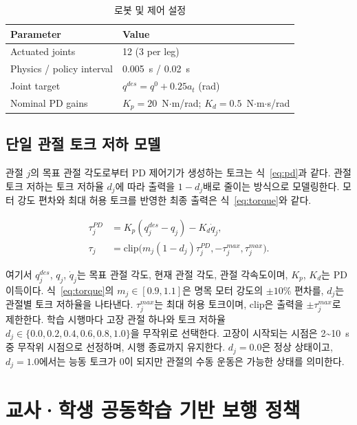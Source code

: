 \begin{table}[!t]
\caption{로봇 및 제어 설정}\label{tab:system}
\centering\paperTableFont
\begin{tabularx}{\columnwidth}{@{}lY@{}}
\toprule
Parameter & Value \\
\midrule
Actuated joints & 12 (3 per leg) \\
Physics / policy interval & 0.005~s / 0.02~s \\
Joint target & $q^{des}=q^0+0.25a_t$ (rad) \\
Nominal PD gains & $K_p=20$~N$\cdot$m/rad; $K_d=0.5$~N$\cdot$m$\cdot$s/rad \\
\bottomrule
\end{tabularx}
\end{table}


\subsection{단일 관절 토크 저하 모델}
관절 $j$의 목표 관절 각도로부터 PD 제어기가 생성하는 토크는 식~\eqref{eq:pd}과 같다. 관절 토크 저하는 토크 저하율 $d_j$에 따라 출력을 $1-d_j$배로 줄이는 방식으로 모델링한다\cite{adapt}. 모터 강도 편차와 최대 허용 토크를 반영한 최종 출력은 식~\eqref{eq:torque}와 같다.
\begin{paperdisplay}[-0.83bp]
\begin{align}
\tau_j^{PD}&=K_p(q_j^{des}-q_j)-K_d\dot q_j,\label{eq:pd} \\
\tau_j&=\mathrm{clip}\bigl(m_j(1-d_j)\tau_j^{PD},-\tau_j^{max},\tau_j^{max}\bigr).\label{eq:torque}
\end{align}
\end{paperdisplay}
여기서 $q_j^{des}$, $q_j$, $\dot q_j$는 목표 관절 각도, 현재 관절 각도, 관절 각속도이며, $K_p$, $K_d$는 PD 이득이다. 식~\eqref{eq:torque}의 $m_j\in[0.9,1.1]$은 명목 모터 강도의 $\pm10$\% 편차를, $d_j$는 관절별 토크 저하율을 나타낸다. $\tau_j^{max}$는 최대 허용 토크이며, $\mathrm{clip}$은 출력을 $\pm\tau_j^{max}$로 제한한다.
학습 시행마다 고장 관절 하나와 토크 저하율 $d_j\in\{0.0,0.2,0.4,0.6,0.8,1.0\}$을 무작위로 선택한다. 고장이 시작되는 시점은 2\textasciitilde{}10~s 중 무작위 시점으로 선정하며, 시행 종료까지 유지한다. $d_j=0.0$은 정상 상태이고, $d_j=1.0$에서는 능동 토크가 0이 되지만 관절의 수동 운동은 가능한 상태를 의미한다.

\section{교사·학생 공동학습 기반 보행 정책}

